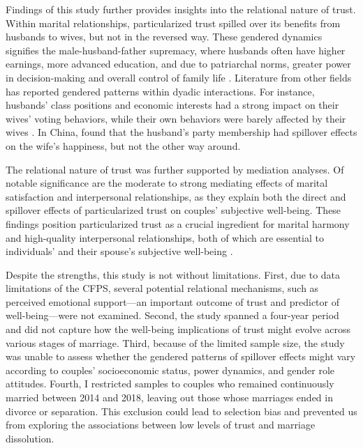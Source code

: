 Findings of this study further provides insights into the relational nature of trust. Within marital relationships, particularized trust spilled over its benefits from husbands to wives, but not in the reversed way. These gendered dynamics signifies the male-husband-father supremacy, where husbands often have higher earnings, more advanced education, and due to patriarchal norms, greater power in decision-making and overall control of family life \parencite{jiUnequalCareUnequal2017}. Literature from other fields has reported gendered patterns within dyadic interactions. For instance, husbands' class positions and economic interests had a strong impact on their wives' voting behaviors, while their own behaviors were barely affected by their wives \parencite{dirkdegraafHusbandsWivesVoting1992}. In China, \textcite{wangDoesHappinessContemporary2019} found that the husband's party membership had spillover effects on the wife's happiness, but not the other way around.

The relational nature of trust was further supported by mediation analyses. Of notable significance are the moderate to strong mediating effects of marital satisfaction and interpersonal relationships, as they explain both the direct and spillover effects of particularized trust on couples' subjective well-being. These findings position particularized trust as a crucial ingredient for marital harmony and high-quality interpersonal relationships, both of which are essential to individuals' and their spouse's subjective well-being \parencite{fitzpatrickAttachmentTrustSatisfaction2017,rusbultCommitmentTrustClose1999}.

Despite the strengths, this study is not without limitations. First, due to data limitations of the CFPS, several potential relational mechanisms, such as perceived emotional support—an important outcome of trust and predictor of well-being—were not examined. Second, the study spanned a four-year period and did not capture how the well-being implications of trust might evolve across various stages of marriage. Third, because of the limited sample size, the study was unable to assess whether the gendered patterns of spillover effects might vary according to couples' socioeconomic status, power dynamics, and gender role attitudes. Fourth, I restricted samples to couples who remained continuously married between 2014 and 2018, leaving out those whose marriages ended in divorce or separation. This exclusion could lead to selection bias and prevented us from exploring the associations between low levels of trust and marriage dissolution.

